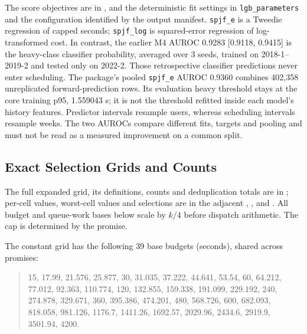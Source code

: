 \documentclass[mathematics,supfile,submit,moreauthors]{Definitions/mdpi}
\newcommand{\devnum}[1]{#1}
\begin{document}
The score objectives are in , and the
deterministic fit settings in \texttt{lgb\_parameters} and the configuration
identified by the output manifest. \texttt{spjf\_e} is a Tweedie regression of
capped seconds; \texttt{spjf\_log} is squared-error regression of log-transformed
cost. In contrast, the earlier M4 AUROC \devnum{0.9283 [0.9118, 0.9415]} is the
heavy-class classifier probability, averaged over \devnum{3} seeds, trained on
\devnum{2018-1}--\devnum{2019-2} and tested only on \devnum{2022-2}. Those
retrospective classifier predictions never enter scheduling. The package's pooled
\texttt{spjf\_e} AUROC \devnum{0.9360} combines \devnum{402{,}358} unreplicated
forward-prediction rows. Its evaluation heavy threshold stays at the core training
p95, \devnum{1.559043} s; it is not the threshold refitted inside each model's
history features. Predictor intervals resample users, whereas scheduling intervals
resample weeks. The two AUROCs compare different fits, targets and pooling and
must not be read as a measured improvement on a common split.

\subsection{Exact Selection Grids and Counts}

The full expanded grid, its definitions, counts and deduplication totals are in
; per-cell values, worst-cell
values and selections are in the adjacent ,
,  and
. All budget and queue-work bases below scale
by $k/\devnum{4}$ before dispatch arithmetic. The cap is determined by the promise.

The constant grid has the following \devnum{39} base budgets (seconds), shared
across promises:
\begin{quote}\small
\devnum{15}, \devnum{17.99}, \devnum{21.576}, \devnum{25.877}, \devnum{30}, \devnum{31.035}, \devnum{37.222}, \devnum{44.641}, \devnum{53.54}, \devnum{60}, \devnum{64.212}, \devnum{77.012}, \devnum{92.363}, \devnum{110.774}, \devnum{120}, \devnum{132.855}, \devnum{159.338}, \devnum{191.099}, \devnum{229.192}, \devnum{240}, \devnum{274.878}, \devnum{329.671}, \devnum{360}, \devnum{395.386}, \devnum{474.201}, \devnum{480}, \devnum{568.726}, \devnum{600}, \devnum{682.093}, \devnum{818.058}, \devnum{981.126}, \devnum{1176.7}, \devnum{1411.26}, \devnum{1692.57}, \devnum{2029.96}, \devnum{2434.6}, \devnum{2919.9}, \devnum{3501.94}, \devnum{4200}.
\end{quote}
\end{document}
